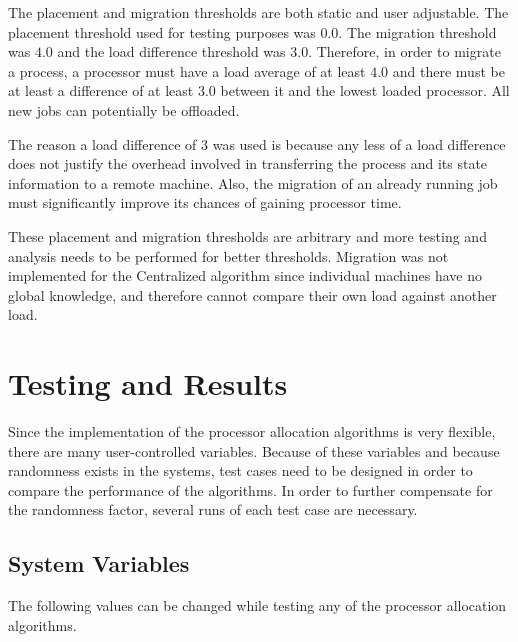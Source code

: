 \documentclass{report}
\begin{document}
The placement and migration thresholds are both static and user adjustable.
The placement threshold used for testing purposes was $0.0$.  The migration
threshold was $4.0$ and the load difference threshold was $3.0$.  Therefore,
in order to migrate a process, a processor must have a load average of at
least $4.0$ and there must be at least a difference of at least $3.0$
between it and the lowest loaded processor.  All new jobs can potentially be
offloaded.

The reason a load difference of 3 was used is because any less of a load
difference does not justify the overhead involved in transferring the
process and its state information to a remote machine.  Also, the migration
of an already running job must significantly improve its chances of gaining
processor time.

These placement and migration thresholds are arbitrary and more testing and
analysis needs to be performed for better thresholds.  Migration was not
implemented for the Centralized algorithm since individual machines have no
global knowledge, and therefore cannot compare their own load against
another load.




\chapter{Testing and Results}

Since the implementation of the processor allocation algorithms is very
flexible, there are many user-controlled variables.  Because of these
variables and because randomness exists in the systems, test cases need to
be designed in order to compare the performance of the algorithms.  In order
to further compensate for the randomness factor, several runs of each test
case are necessary.

\section{System Variables}

The following values can be changed while testing any of the processor
allocation algorithms.
\end{document}
